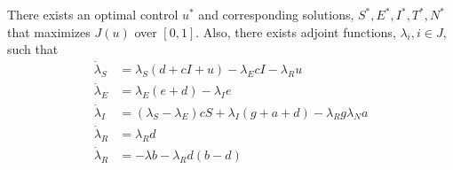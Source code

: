 \begin{theorem} 
    There exists an optimal control $u^{*}$ and corresponding solutions, \break
    $S^{*}, E^{*}, I^{*}, T^{*}, N^{*}$ that maximizes $J(u)$ over $[0, 1]$. 
    Also, there exists adjoint functions, $\lambda_{i}, i \in J$, such that
    \begin{align*}
         \dot{\lambda}_{S} &=
            \lambda_{S}\left(d + cI + u \right) - \lambda_{E}cI - \lambda_{R}u   \\
        \dot{\lambda}_{E} &=
            \lambda_{E}(e + d) - \lambda_{I}e  \\
        \dot{\lambda}_{I} &=
            (\lambda_{S} - \lambda_{E})cS + \lambda_{I}(g + a +d) - \lambda_{R}g
            \lambda_{N}a\\
        \dot{\lambda}_{R} &=    \lambda_{R}d  \\
        \dot{\lambda}_{R} &=
            - \lambda b - \lambda_{R}d  (b - d)
    \end{align*}
\end{theorem}
 
